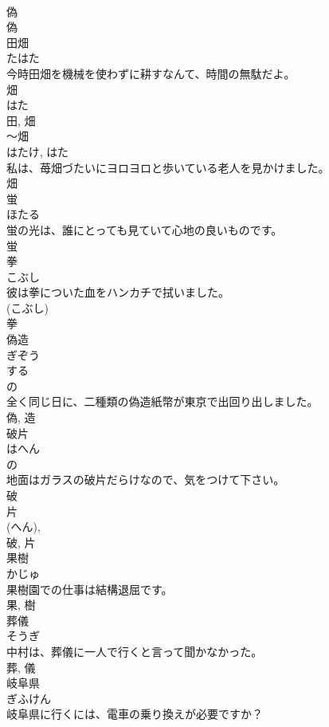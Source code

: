 \documentclass[8pt]{extreport}
\begin{document}
\begin{CJK}{UTF8}{min}
\\	偽
\\	偽	
\\	田畑	
\\	たはた	
\\	今時田畑を機械を使わずに耕すなんて、時間の無駄だよ。	
\\	畑 
\\	はた 
\\	田, 畑	
\\	〜畑	
\\	はたけ, はた	
\\	私は、苺畑づたいにヨロヨロと歩いている老人を見かけました。	
\\	畑	
\\	蛍	
\\	ほたる	
\\	蛍の光は、誰にとっても見ていて心地の良いものです。	
\\	蛍	
\\	拳	
\\	こぶし	
\\	彼は拳についた血をハンカチで拭いました。	
\\	(こぶし) 
\\	拳	
\\	偽造	
\\	ぎぞう	
\\	する 
\\	の 
\\	全く同じ日に、二種類の偽造紙幣が東京で出回り出しました。	
\\	偽, 造	
\\	破片	
\\	はへん	
\\	の 
\\	地面はガラスの破片だらけなので、気をつけて下さい。	
\\	破 
\\	片 
\\	(へん), 
\\	破, 片	
\\	果樹	
\\	かじゅ	
\\	果樹園での仕事は結構退屈です。	
\\	果, 樹	
\\	葬儀	
\\	そうぎ	
\\	中村は、葬儀に一人で行くと言って聞かなかった。	
\\	葬, 儀	
\\	岐阜県	
\\	ぎふけん	
\\	岐阜県に行くには、電車の乗り換えが必要ですか？	

\end{CJK}
\end{document}
